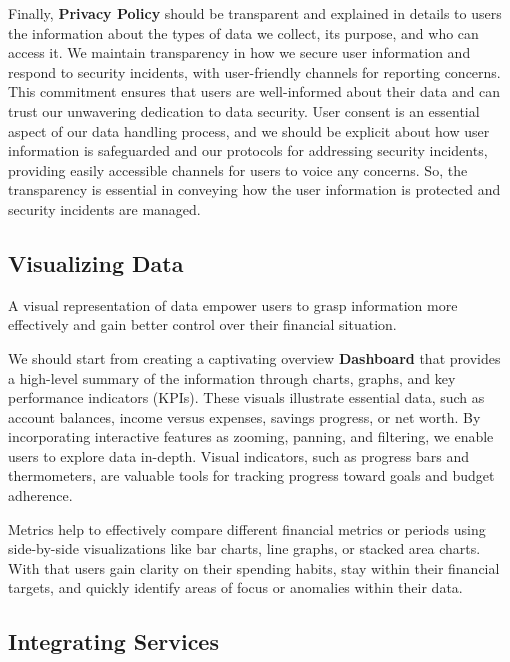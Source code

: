 Finally, \textbf{Privacy Policy} should be transparent and explained in details to users the information about the 
types of data we collect, its purpose, and who can access it. We maintain transparency in how we secure user information 
and respond to security incidents, with user-friendly channels for reporting concerns. This commitment ensures that 
users are well-informed about their data and can trust our unwavering dedication to data security. User consent is an 
essential aspect of our data handling process, and we should be explicit about how user information is safeguarded and 
our protocols for addressing security incidents, providing easily accessible channels for users to voice any concerns. 
So, the transparency is essential in conveying how the user information is protected and security incidents are managed.


\subsection{Visualizing Data}

A visual representation of data empower users to grasp information more effectively and gain better control over their 
financial situation.

We should start from creating a captivating overview \textbf{Dashboard} that provides a high-level summary of the 
information through charts, graphs, and key performance indicators (KPIs). These visuals illustrate essential data, 
such as account balances, income versus expenses, savings progress, or net worth.  By incorporating interactive features 
as zooming, panning, and filtering, we enable users to explore data in-depth. Visual indicators, such as progress bars 
and thermometers, are valuable tools for tracking progress toward goals and budget adherence. 

Metrics help to effectively compare different financial metrics or periods using side-by-side visualizations like bar 
charts, line graphs, or stacked area charts. With that users gain clarity on their spending habits, stay within 
their financial targets, and quickly identify areas of focus or anomalies within their data.


\subsection{Integrating Services}

